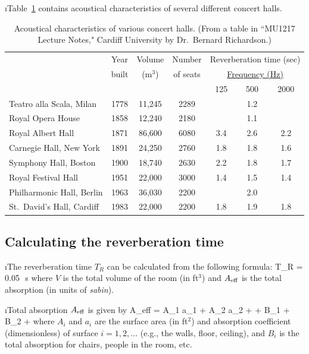 \i Table~\ref{t:concert_halls} contains 
acoustical characteristics of several different concert halls.
%
\begin{table}[htbp]
\begin{center}
\begin{tabular}{l c c c c c c}
\hline
& Year & Volume & Number & \multicolumn{3}{c}{Reverberation time (sec)}\\
& built & (m${}^3$) & of seats &\multicolumn{3}{c}{\underline{Frequency (Hz)}} \\
&       &           &          & 125 & 500 & 2000 \\
\hline
Teatro alla Scala, Milan  & 1778 & 11,245 & 2289 &     & 1.2 &     \\
Royal Opera House         & 1858 & 12,240 & 2180 &     & 1.1 &     \\
Royal Albert Hall         & 1871 & 86,600 & 6080 & 3.4 & 2.6 & 2.2 \\
Carnegie Hall, New York   & 1891 & 24,250 & 2760 & 1.8 & 1.8 & 1.6 \\
Symphony Hall, Boston     & 1900 & 18,740 & 2630 & 2.2 & 1.8 & 1.7 \\
Royal Festival Hall       & 1951 & 22,000 & 3000 & 1.4 & 1.5 & 1.4 \\
Philharmonic Hall, Berlin & 1963 & 36,030 & 2200 &     & 2.0 &     \\
St.\ David's Hall, Cardiff& 1983 & 22,000 & 2200 & 1.8 & 1.9 & 1.8 \\
\hline
\end{tabular}
\caption{Acoustical characteristics of various
concert halls.
(From a table in
``MU1217 Lecture Notes," Cardiff University
by Dr.~Bernard Richardson.)}
\label{t:concert_halls}
\end{center}
\end{table}
%

\ei
\subsection{Calculating the reverberation time}

\bi

\i The reverberation time $T_R$ can be calculated from 
the following formula:
%
\be
T_R = 0.05\,~{\rm s}
\ee
%
where $V$ is the total volume of the room (in ft${}^3$)
and $A_{\rm eff}$ is the total absorption (in units of {\em sabin}).

\i Total absorption $A_{\rm eff}$ is given by
%
\be
A_{\rm eff} = A_1 a_1 + A_2 a_2 + \cdots + B_1 + B_2 + \cdots
\ee
%
where $A_i$ and $a_i$ are the surface area (in ft$^2$) 
and absorption coefficient (dimensionless) of surface 
$i=1,2,\dots$
(e.g., the walls, floor, ceiling), 
and $B_i$ is the total absorption for chairs, people
in the room, etc.

